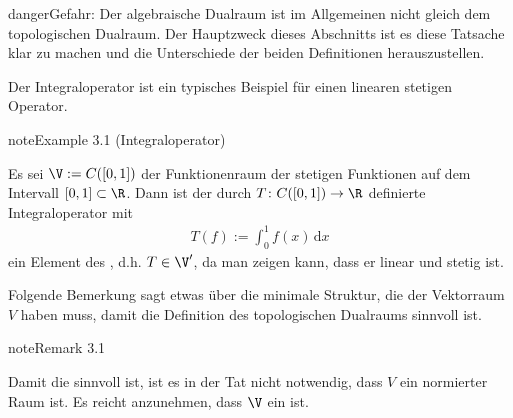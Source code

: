 \documentclass[letterpaper,10pt,german]{jupyterBook}
\begin{document}
\begin{sphinxadmonition}{danger}{Gefahr:}
\sphinxAtStartPar
Der algebraische Dualraum ist im Allgemeinen nicht gleich dem topologischen Dualraum.
Der Hauptzweck dieses Abschnitts ist es diese Tatsache klar zu machen und die Unterschiede der beiden Definitionen herauszustellen.
\end{sphinxadmonition}

\sphinxAtStartPar
Der Integraloperator ist ein typisches Beispiel für einen linearen stetigen Operator.
\label{vektoranalysis/multilinear:example-2}
\begin{sphinxadmonition}{note}{Example 3.1 (Integraloperator)}



\sphinxAtStartPar
Es sei \(\V := C([0,1])\) der Funktionenraum der stetigen Funktionen auf dem Intervall \([0,1] \subset \R\).
Dann ist der durch \(T \colon C([0,1]) \rightarrow \R\) definierte Integraloperator mit
\begin{equation*}
\begin{split}T(f) := \int_0^1 f(x) \, \mathrm{d}x\end{split}
\end{equation*}
\sphinxAtStartPar
ein Element des , d.h. \(T \in \V^\prime\), da man zeigen kann, dass er linear und stetig ist.
\end{sphinxadmonition}

\sphinxAtStartPar
Folgende Bemerkung sagt etwas über die minimale Struktur, die der Vektorraum \(V\) haben muss, damit die Definition des topologischen Dualraums sinnvoll ist.
\label{vektoranalysis/multilinear:remark-3}
\begin{sphinxadmonition}{note}{Remark 3.1}



\sphinxAtStartPar
Damit die {\hyperref[\detokenize{vektoranalysis/multilinear:def:topologischerDualraum}]{}} sinnvoll ist, ist es in der Tat nicht notwendig, dass \(V\) ein normierter Raum ist. Es reicht anzunehmen, dass \(\V\) ein  ist.
\end{sphinxadmonition}
\end{document}
